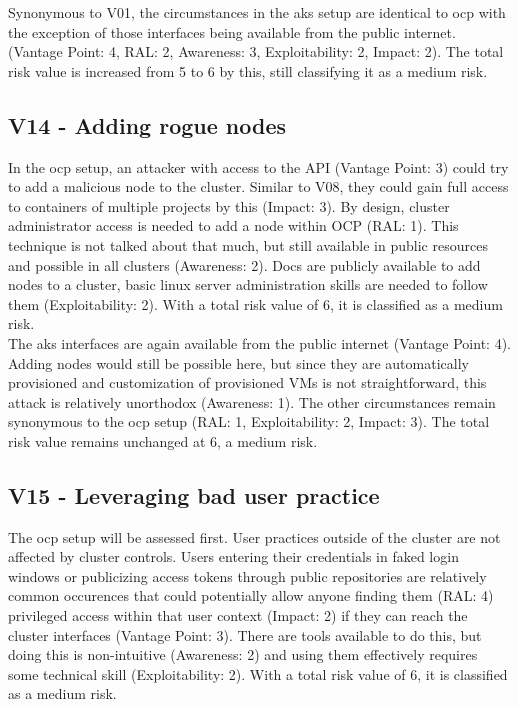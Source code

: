 Synonymous to V01, the circumstances in the \gls{aks} setup are identical to \gls{ocp} with the exception of those interfaces being available from the public internet. (Vantage Point: 4, RAL: 2, Awareness: 3, Exploitability: 2, Impact: 2). 
The total risk value is increased from 5 to 6 by this, still classifying it as a medium risk.

\subsection{V14 - Adding rogue nodes}

In the \gls{ocp} setup, an attacker with access to the API (Vantage Point: 3) could try to add a malicious node to the cluster. Similar to V08, they could gain full access to containers of multiple projects by this (Impact: 3).
By design, cluster administrator access is needed to add a node within OCP (RAL: 1).
This technique is not talked about that much, but still available in public resources and possible in all clusters (Awareness: 2). Docs are publicly available to add nodes to a cluster, basic linux server administration skills are needed to follow them (Exploitability: 2).
With a total risk value of 6, it is classified as a medium risk. \\


The \gls{aks} interfaces are again available from the public internet (Vantage Point: 4).
Adding nodes would still be possible here, but since they are automatically provisioned and customization of provisioned VMs is not straightforward, this attack is relatively unorthodox (Awareness: 1).
The other circumstances remain synonymous to the \gls{ocp} setup (RAL: 1, Exploitability: 2, Impact: 3).
The total risk value remains unchanged at 6, a medium risk.

\subsection{V15 - Leveraging bad user practice}

The \gls{ocp} setup will be assessed first.
User practices outside of the cluster are not affected by cluster controls. Users entering their credentials in faked login windows or publicizing access tokens through public repositories are relatively common occurences that could potentially allow anyone finding them (RAL: 4) privileged access within that user context (Impact: 2) if they can reach the cluster interfaces (Vantage Point: 3).
There are tools available to do this, but doing this is non-intuitive (Awareness: 2) and using them effectively requires some technical skill (Exploitability: 2).
With a total risk value of 6, it is classified as a medium risk. \\


